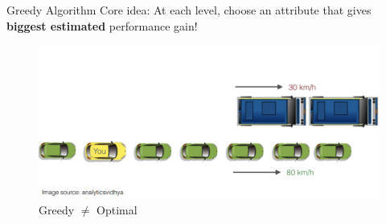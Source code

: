 \documentclass[usenames,dvipsnames]{beamer}
\begin{document}
\begin{frame}{Greedy Algorithm}
Core idea: At each level, choose an attribute that gives
\textbf{biggest estimated} performance gain!

\begin{figure}
	\centering
	\includegraphics[width=0.8\linewidth]{../assets/decision-trees/diagrams/gredy}
	\caption{Greedy $\neq$ Optimal}
	\label{fig:gredy}
\end{figure}

\end{frame}
\end{document}
